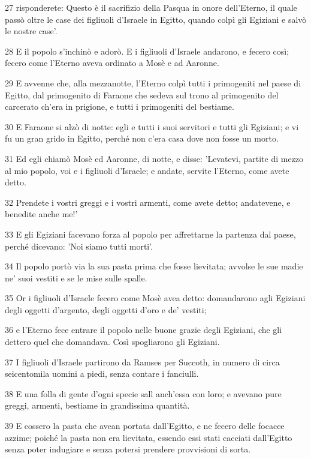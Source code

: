 \par 27 risponderete: Questo è il sacrifizio della Pasqua in onore dell'Eterno, il quale passò oltre le case dei figliuoli d'Israele in Egitto, quando colpì gli Egiziani e salvò le nostre case'.
\par 28 E il popolo s'inchinò e adorò. E i figliuoli d'Israele andarono, e fecero così; fecero come l'Eterno aveva ordinato a Mosè e ad Aaronne.
\par 29 E avvenne che, alla mezzanotte, l'Eterno colpì tutti i primogeniti nel paese di Egitto, dal primogenito di Faraone che sedeva sul trono al primogenito del carcerato ch'era in prigione, e tutti i primogeniti del bestiame.
\par 30 E Faraone si alzò di notte: egli e tutti i suoi servitori e tutti gli Egiziani; e vi fu un gran grido in Egitto, perché non c'era casa dove non fosse un morto.
\par 31 Ed egli chiamò Mosè ed Aaronne, di notte, e disse: 'Levatevi, partite di mezzo al mio popolo, voi e i figliuoli d'Israele; e andate, servite l'Eterno, come avete detto.
\par 32 Prendete i vostri greggi e i vostri armenti, come avete detto; andatevene, e benedite anche me!'
\par 33 E gli Egiziani facevano forza al popolo per affrettarne la partenza dal paese, perché dicevano: 'Noi siamo tutti morti'.
\par 34 Il popolo portò via la sua pasta prima che fosse lievitata; avvolse le sue madie ne' suoi vestiti e se le mise sulle spalle.
\par 35 Or i figliuoli d'Israele fecero come Mosè avea detto: domandarono agli Egiziani degli oggetti d'argento, degli oggetti d'oro e de' vestiti;
\par 36 e l'Eterno fece entrare il popolo nelle buone grazie degli Egiziani, che gli dettero quel che domandava. Così spogliarono gli Egiziani.
\par 37 I figliuoli d'Israele partirono da Ramses per Succoth, in numero di circa seicentomila uomini a piedi, senza contare i fanciulli.
\par 38 E una folla di gente d'ogni specie salì anch'essa con loro; e avevano pure greggi, armenti, bestiame in grandissima quantità.
\par 39 E cossero la pasta che avean portata dall'Egitto, e ne fecero delle focacce azzime; poiché la pasta non era lievitata, essendo essi stati cacciati dall'Egitto senza poter indugiare e senza potersi prendere provvisioni di sorta.
